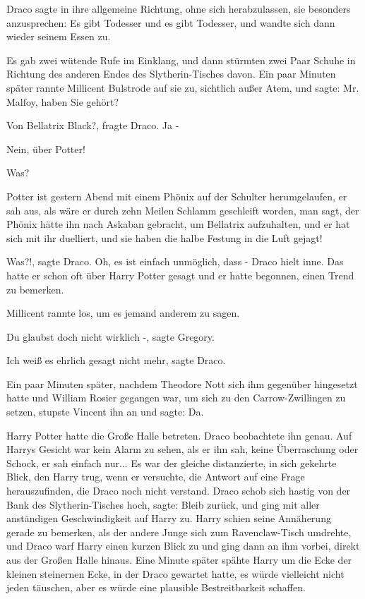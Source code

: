 Draco sagte in ihre allgemeine Richtung, ohne sich herabzulassen, sie besonders
anzusprechen: \glqq Es gibt Todesser und es gibt Todesser\grqq{}, und wandte
sich dann wieder seinem Essen zu.

Es gab zwei wütende Rufe im Einklang, und dann stürmten zwei Paar Schuhe in
Richtung des anderen Endes des Slytherin-Tisches davon. Ein paar Minuten später
rannte Millicent Bulstrode auf sie zu, sichtlich außer Atem, und sagte: \glqq
Mr. Malfoy, haben Sie gehört?\grqq{}

\glqq Von Bellatrix Black?\grqq{}, fragte Draco. \glqq Ja -\grqq{}

\glqq Nein, über Potter!\grqq{}

\glqq Was?\grqq{}

\glqq Potter ist gestern Abend mit einem Phönix auf der Schulter herumgelaufen,
er sah aus, als wäre er durch zehn Meilen Schlamm geschleift worden, man sagt,
der Phönix hätte ihn nach Askaban gebracht, um Bellatrix aufzuhalten, und er hat
sich mit ihr duelliert, und sie haben die halbe Festung in die Luft
gejagt!\grqq{}

\glqq Was?!\grqq{}, sagte Draco. \glqq Oh, es ist einfach unmöglich, dass
-\grqq{} Draco hielt inne. Das hatte er schon oft über Harry Potter gesagt und
er hatte begonnen, einen Trend zu bemerken.

Millicent rannte los, um es jemand anderem zu sagen.

\glqq Du glaubst doch nicht wirklich -\grqq{}, sagte Gregory.

\glqq Ich weiß es ehrlich gesagt nicht mehr\grqq{}, sagte Draco.

Ein paar Minuten später, nachdem Theodore Nott sich ihm gegenüber hingesetzt
hatte und William Rosier gegangen war, um sich zu den Carrow-Zwillingen zu
setzen, stupste Vincent ihn an und sagte: \glqq Da.\grqq{}

Harry Potter hatte die Große Halle betreten. Draco beobachtete ihn genau. Auf
Harrys Gesicht war kein Alarm zu sehen, als er ihn sah, keine Überraschung oder
Schock, er sah einfach nur... Es war der gleiche distanzierte, in sich gekehrte
Blick, den Harry trug, wenn er versuchte, die Antwort auf eine Frage
herauszufinden, die Draco noch nicht verstand. Draco schob sich hastig von der
Bank des Slytherin-Tisches hoch, sagte: \glqq Bleib zurück\grqq{}, und ging mit
aller anständigen Geschwindigkeit auf Harry zu. Harry schien seine Annäherung
gerade zu bemerken, als der andere Junge sich zum Ravenclaw-Tisch umdrehte, und
Draco warf Harry einen kurzen Blick zu und ging dann an ihm vorbei, direkt aus
der Großen Halle hinaus. Eine Minute später spähte Harry um die Ecke der kleinen
steinernen Ecke, in der Draco gewartet hatte, es würde vielleicht nicht jeden
täuschen, aber es würde eine plausible Bestreitbarkeit schaffen.

